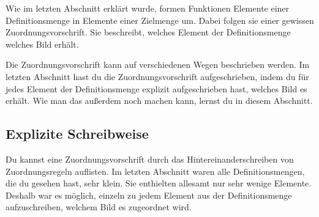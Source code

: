 \documentclass[../../main.tex]{subfiles}
\begin{document}
\label{sec:abbildungen_explizite_schreibweise}
Wie im letzten Abschnitt erklärt wurde, formen Funktionen Elemente einer Definitionsmenge in Elemente einer Zielmenge um. Dabei folgen sie einer gewissen Zuordnungsvorschrift. Sie beschreibt, welches Element der Definitionsmenge welches Bild erhält.

Die Zuordnungsvorschrift kann auf verschiedenen Wegen beschrieben werden. Im letzten Abschnitt hast du die Zuordnungsvorschrift aufgeschrieben, indem du für jedes Element der Definitionsmenge explizit aufgeschrieben hast, welches Bild es erhält. Wie man das außerdem noch machen kann, lernst du in diesem Abschnitt.

\subsection{Explizite Schreibweise}

Du kannst eine Zuordnungsvorschrift durch das Hintereinanderschreiben von Zuordnungsregeln auflisten. Im letzten Abschnitt waren alle Definitionsmengen, die du gesehen hast, sehr klein. Sie enthielten allesamt nur sehr wenige Elemente. Deshalb war es möglich, einzeln zu jedem Element aus der Definitionsmenge aufzuschreiben, welchem Bild es zugeordnet wird.
\end{document}
